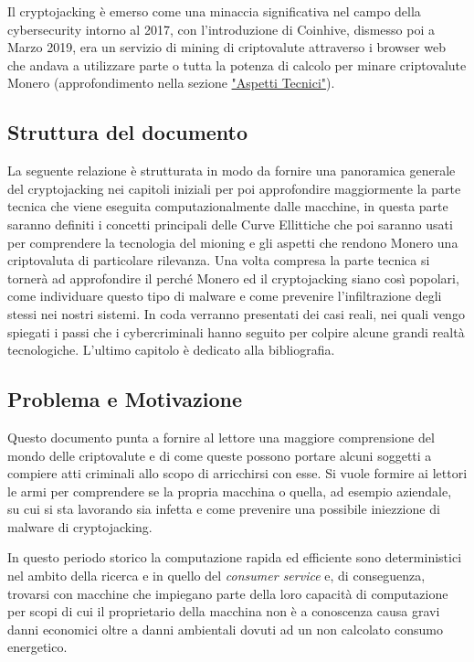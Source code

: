 \documentclass[12pt,a4paper]{article}
\begin{document}
Il cryptojacking è emerso come una minaccia significativa nel campo della
cybersecurity intorno al 2017, con l'introduzione di Coinhive, dismesso poi a
Marzo 2019, era un servizio di mining di criptovalute attraverso i browser web 
che andava a utilizzare parte o tutta la potenza di calcolo per minare
criptovalute Monero (approfondimento nella sezione
\hyperref[sec:aspetti_tecnici]{"Aspetti Tecnici"}). 

\subsection{Struttura del documento}
La seguente relazione è strutturata in modo da fornire una panoramica generale
del cryptojacking nei capitoli iniziali per poi approfondire maggiormente la
parte tecnica che viene eseguita computazionalmente dalle macchine, in questa
parte saranno definiti i concetti principali delle Curve Ellittiche che poi
saranno usati per comprendere la tecnologia del mioning e gli aspetti che
rendono Monero una criptovaluta di particolare rilevanza. Una volta compresa la
parte tecnica si tornerà ad approfondire il perché Monero ed il cryptojacking
siano così popolari, come individuare questo tipo di malware e come prevenire
l'infiltrazione degli stessi nei nostri sistemi. In coda verranno presentati dei
casi reali, nei quali vengo spiegati i passi che i cybercriminali hanno seguito
per colpire alcune grandi realtà tecnologiche. L'ultimo capitolo è dedicato alla
bibliografia.

\subsection{Problema e Motivazione}
Questo documento punta a fornire al lettore una maggiore comprensione del mondo
delle criptovalute e di come queste possono portare alcuni soggetti a compiere
atti criminali allo scopo di arricchirsi con esse. Si vuole formire ai lettori
le armi per comprendere se la propria macchina o quella, ad esempio aziendale,
su cui si sta lavorando sia infetta e come prevenire una possibile iniezzione di
malware di cryptojacking.

In questo periodo storico la computazione rapida ed efficiente sono
deterministici nel ambito della ricerca e in quello del \textit{consumer
service} e, di conseguenza, trovarsi con macchine che impiegano parte della loro
capacità di computazione per scopi di cui il proprietario della macchina non è a
conoscenza causa gravi danni economici oltre a danni ambientali dovuti ad un non
calcolato consumo energetico.
\end{document}
